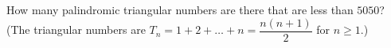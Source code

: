 How many palindromic triangular numbers are there that are less than $5050$? (The triangular numbers are $T_n=1+2+\dots+n=\dfrac{n(n+1)}{2}$ for $n\ge1$.)
